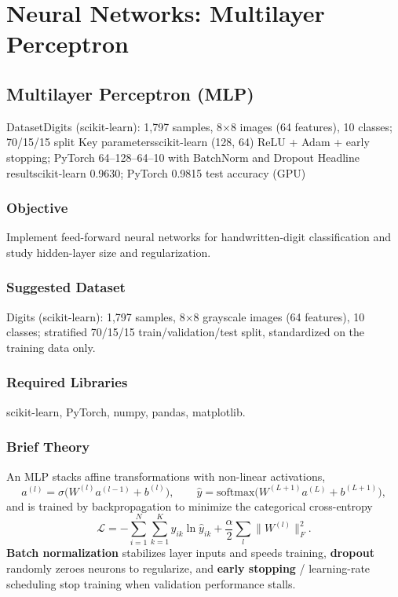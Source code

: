 
\part{Neural Networks: Multilayer Perceptron}

\chapter{Multilayer Perceptron (MLP)}\label{exp:13}


\quickfacts
  {Dataset}{Digits (scikit-learn): 1,797 samples, 8$\times$8 images (64 features), 10 classes; 70/15/15 split}
  {Key parameters}{scikit-learn (128, 64) ReLU + Adam + early stopping; PyTorch 64--128--64--10 with BatchNorm and Dropout}
  {Headline result}{scikit-learn 0.9630; PyTorch 0.9815 test accuracy (GPU)}

\section{Objective}
Implement feed-forward neural networks for handwritten-digit classification and study
hidden-layer size and regularization.

\section{Suggested Dataset}
Digits (scikit-learn): 1,797 samples, 8$\times$8 grayscale images (64 features), 10 classes;
stratified 70/15/15 train/validation/test split, standardized on the training data only.

\section{Required Libraries}
scikit-learn, PyTorch, numpy, pandas, matplotlib.

\section{Brief Theory}
An MLP stacks affine transformations with non-linear activations,
\[
a^{(l)} = \sigma\bigl(W^{(l)} a^{(l-1)} + b^{(l)}\bigr), \qquad
\hat{y} = \mathrm{softmax}\bigl(W^{(L+1)} a^{(L)} + b^{(L+1)}\bigr),
\]
and is trained by backpropagation to minimize the categorical cross-entropy
\[
\mathcal{L} = -\sum_{i=1}^{N}\sum_{k=1}^{K} y_{ik}\ln \hat{y}_{ik}
              + \frac{\alpha}{2}\sum_{l}\lVert W^{(l)}\rVert_F^2 .
\]
\textbf{Batch normalization} stabilizes layer inputs and speeds training, \textbf{dropout}
randomly zeroes neurons to regularize, and \textbf{early stopping} / learning-rate scheduling
stop training when validation performance stalls.

